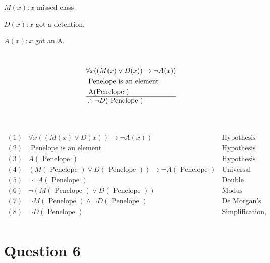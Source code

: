 \documentclass[10pt]{article}
\begin{document}
{$M(x): x$ missed class.}

{$D(x): x$ got a detention.}

{$A(x): x$ got an A.}

\\

$$
\begin{aligned}
& \forall x((M(x) \vee D(x)) \rightarrow \neg A(x)) \\
& \text { Penelope is an element } \\
& \text { A(Penelope }) \\
\hline
& \therefore \neg D(\text { Penelope })
\end{aligned}
$$

 \\

 \\

\[
\begin{array}{rrr}
(1) & \forall x((M(x) \vee D(x)) \rightarrow \neg A(x))                                              & \text{Hypothesis}\\
(2) & \text { Penelope is an element }                                                               & \text{Hypothesis}\\
(3) & A(\text { Penelope })                                                                          & \text{Hypothesis}\\
(4) & (M(\text { Penelope }) \vee D(\text { Penelope })) \rightarrow \neg A(\text { Penelope })      & \text{Universal instantiation, 1, 2}\\
(5) & \neg \neg A(\text { Penelope })                                                                & \text{Double negation law, 3}\\
(6) & \neg(M(\text { Penelope }) \vee D(\text { Penelope }))                                         & \text{Modus tollens, 4,5}\\
(7) & \neg M(\text { Penelope }) \wedge \neg D(\text { Penelope })                                   & \text{De Morgan's law, 6}\\
(8) & \neg D(\text { Penelope })                                                                     & \text{Simplification, 7}\\
\end{array}
\]

\pagebreak
\section*{Question 6}
\end{document}
